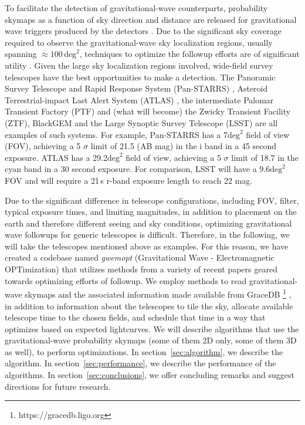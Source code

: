 \documentclass[twocolumn]{aastex62}
\begin{document}
To facilitate the detection of gravitational-wave counterparts, probability skymaps as a function of sky direction and distance are released for gravitational wave triggers produced by the detectors \citep{SiPr2014,BeMa2015}. 
Due to the significant sky coverage required to observe the gravitational-wave sky localization regions, usually spanning $\approx 100\,\textrm{deg}^2$, techniques to optimize the followup efforts are of significant utility \citep{Fair2009,Fair2011,Grover:2013,WeCh2010,SiAy2014,SiPr2014,BeMa2015,EsVi2015,CoLi2015,KlVe2016}.
Given the large sky localization regions involved, wide-field survey telescopes have the best opportunities to make a detection. 
The Panoramic Survey Telescope and Rapid Response System (Pan-STARRS) \citep{MoKa2012}, Asteroid Terrestrial-impact Last Alert System (ATLAS) \citep{Ton2011}, the intermediate Palomar Transient Factory (PTF) \citep{RaSh2009} and (what will become) the Zwicky Transient Facility (ZTF), BlackGEM \citep{BlGr2015} and the Large Synoptic Survey Telescope (LSST) \citep{Ivezic2014} are all examples of such systems.
For example, Pan-STARRS has a 7$\textrm{deg}^2$ field of view (FOV), achieving a 5 $\sigma$ limit of 21.5 (AB mag) in the i band in a 45 second exposure. ATLAS has a 29.2$\textrm{deg}^2$ field of view, achieving a 5 $\sigma$ limit of 18.7 in the cyan band in a 30 second exposure. For comparison, LSST will have a $9.6\textrm{deg}^2$ FOV and will require a 21\,s r-band exposure length to reach 22 mag.

Due to the significant difference in telescope configurations, including FOV, filter, typical exposure times, and limiting magnitudes, in addition to placement on the earth and therefore different seeing and sky conditions, optimizing gravitational wave followups for generic telescopes is difficult. Therefore, in the following, we will take the telescopes mentioned above as examples.
For this reason, we have created a codebase named \emph{gwemopt} (Gravitational Wave - Electromagnetic OPTimization) that utilizes methods from a variety of recent papers geared towards optimizing efforts of followup. We employ methods to read gravitational-wave skymaps and the associated information made available from GraceDB \footnote{https://gracedb.ligo.org} \citep{AbEA2016b}, in addition to information about the telescopes to tile the sky, allocate available telescope time to the chosen fields, and schedule that time in a way that optimizes based on expected lightcurves.
We will describe algorithms that use the gravitational-wave probability skymaps (some of them 2D only, some of them 3D as well), to perform optimizations.
In section~\ref{sec:algorithm}, we describe the algorithm.
In section~\ref{sec:performance}, we describe the performance of the algorithms.
In section~\ref{sec:conclusions}, we offer concluding remarks and suggest directions for future research.
\end{document}
